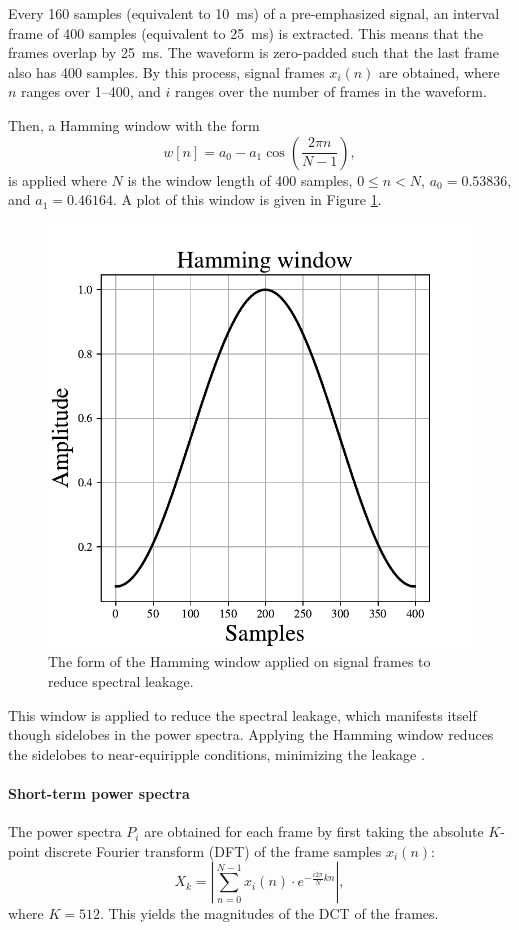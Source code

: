 			Every 160 samples (equivalent to \SI{10}{ms}) of a pre-emphasized signal, an interval frame of 400 samples (equivalent to \SI{25}{ms}) is extracted.
			This means that the frames overlap by \SI{25}{ms}.
			The waveform is zero-padded such that the last frame also has 400 samples.
			By this process, signal frames $x_i(n)$ are obtained, where $n$ ranges over 1--400, and $i$ ranges over the number of frames in the waveform.

			Then, a Hamming window with the form
			\begin{equation}\label{eq:hamming}
				w\left[n\right] = a_0 - a_1\cos\left(\frac{2\pi n}{N-1}\right),
			\end{equation}
			is applied where $N$ is the window length of 400 samples, $0 \leq n < N$, $a_0 = 0.53836$, and $a_1 = 0.46164$.
			A plot of this window is given in Figure \ref{fig:hamming}.
			\begin{figure}[ht]
				\centering
			    \includegraphics[width=0.45\linewidth]{gfx/hamming}
			    \caption{The form of the Hamming window applied on signal frames to reduce spectral leakage.}
			    \label{fig:hamming}
			\end{figure}
			This window is applied to reduce the spectral leakage, which manifests itself though sidelobes in the power spectra.
			Applying the Hamming window reduces the sidelobes to near-equiripple conditions, minimizing the leakage \citep{SASPWEB2011}.

		\paragraph{Short-term power spectra}

			The power spectra $P_i$ are obtained for each frame by first taking the absolute $K$-point discrete Fourier transform (DFT) of the frame samples $x_i(n)$:
			\begin{equation}
				X_k = \left|\sum_{n=0}^{N-1}x_i(n)\cdot e^{-\frac{i2\pi}{N}kn}\right|,
			\end{equation}
			where $K=512$.
			This yields the magnitudes of the DCT of the frames.

